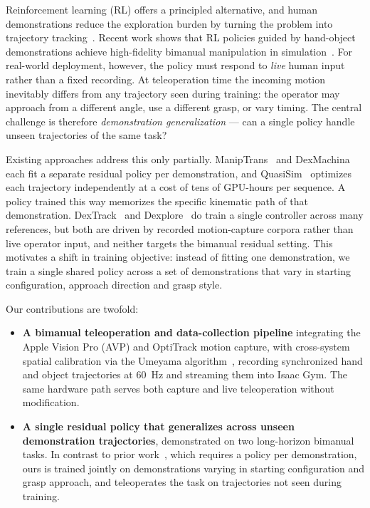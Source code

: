 \documentclass[letterpaper, 10 pt, conference]{ieeeconf}
\begin{document}
Reinforcement learning (RL) offers a principled alternative, and human demonstrations
reduce the exploration burden by turning the problem into trajectory
tracking~\cite{maniptrans, dexmachina, dextrack}. Recent work shows that RL policies
guided by hand-object demonstrations achieve high-fidelity bimanual manipulation in
simulation~\cite{maniptrans}. For real-world deployment, however, the policy must
respond to \emph{live} human input rather than a fixed recording. At teleoperation time
the incoming motion inevitably differs from any trajectory seen during training: the
operator may approach from a different angle, use a different grasp, or vary timing.
The central challenge is therefore \emph{demonstration generalization} --- can a single
policy handle unseen trajectories of the same task?

Existing approaches address this only partially. ManipTrans~\cite{maniptrans} and
DexMachina~\cite{dexmachina} each fit a separate residual policy per demonstration, and
QuasiSim~\cite{quasisim} optimizes each trajectory independently at a cost of tens of
GPU-hours per sequence. A policy trained this way memorizes the specific kinematic path
of that demonstration. DexTrack~\cite{dextrack} and Dexplore~\cite{dexplore} do train a
single controller across many references, but both are driven by recorded motion-capture
corpora rather than live operator input, and neither targets the bimanual residual
setting. This motivates a shift in training objective: instead of fitting one
demonstration, we train a single shared policy across a set of demonstrations that vary
in starting configuration, approach direction and grasp style.

Our contributions are twofold:

\begin{itemize}
\item \textbf{A bimanual teleoperation and data-collection pipeline} integrating the
Apple Vision Pro (AVP) and OptiTrack motion capture, with cross-system spatial
calibration via the Umeyama algorithm~\cite{umeyama}, recording synchronized hand and
object trajectories at \SI{60}{\hertz} and streaming them into Isaac Gym. The same
hardware path serves both capture and live teleoperation without modification.

\item \textbf{A single residual policy that generalizes across unseen demonstration
trajectories}, demonstrated on two long-horizon bimanual tasks. In contrast to prior
work~\cite{maniptrans}, which requires a policy per demonstration, ours is trained
jointly on demonstrations varying in starting configuration and grasp approach, and
teleoperates the task on trajectories not seen during training.
\end{itemize}
\end{document}
